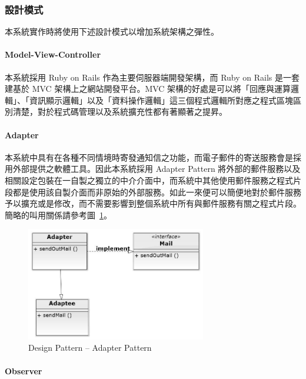 \documentclass[11pt]{article}
\begin{document}
\subsubsection{設計模式}

本系統實作時將使用下述設計模式以增加系統架構之彈性。

\paragraph{Model-View-Controller}

本系統採用 Ruby on Rails 作為主要伺服器端開發架構，而 Ruby on Rails 是一套建基於 MVC 架構上之網站開發平台。MVC 架構的好處是可以將「回應與運算邏輯」、「資訊顯示邏輯」以及「資料操作邏輯」這三個程式邏輯所對應之程式區塊區別清楚，對於程式碼管理以及系統擴充性都有著顯著之提昇。

\paragraph{Adapter}

本系統中具有在各種不同情境時寄發通知信之功能，而電子郵件的寄送服務會是採用外部提供之軟體工具。因此本系統採用 Adapter Pattern 將外部的郵件服務以及相關設定包裝在一自製之獨立的中介介面中，而系統中其他使用郵件服務之程式片段都是使用該自製介面而非原始的外部服務。如此一來便可以簡便地對於郵件服務予以擴充或是修改，而不需要影響到整個系統中所有與郵件服務有關之程式片段。簡略的叫用關係請參考圖~\ref{pic:dp:ada}。

\begin{figure}[H]
\centering
\includegraphics[width=0.7\textwidth]{img/dp/adapter.jpg}
\caption{Design Pattern -- Adapter Pattern}
\label{pic:dp:ada}
\end{figure}

\paragraph{Observer}
\end{document}
